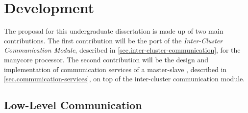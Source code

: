 \chapter{Development}
\label{ch.development}


	The proposal for this undergraduate dissertation is made up of two main contributions.
	The first contribution will be the port of the \textit{Inter-Cluster Communication Module},
	described in \autoref{sec.inter-cluster-communication}, for the \mppa manycore processor.
	The second contribution will be the design and implementation of communication services
	of a master-slave \os, described in \autoref{sec.communication-services}, on top of
	the inter-cluster communication module.


	\section{Low-Level Communication}
	\label{sec.low-level-comm}



